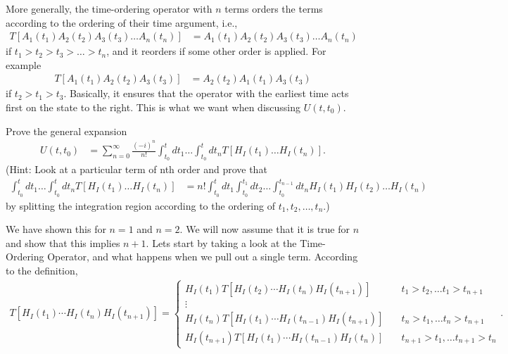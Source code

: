 \documentclass[working, oneside]{../../Preambles/tuftebook}
\begin{document}
More generally, the time-ordering operator with \( n \) terms orders the terms according to the ordering of their time argument, i.e.,
\begin{align*}
T[A_1(t_1) A_2(t_2) A_3(t_3) \dots A_n(t_n)]
&= A_1(t_1) A_2(t_2) A_3(t_3) \dots A_n(t_n) \tag{61}
\end{align*}
if \( t_1 > t_2 > t_3 > \dots > t_n \), and it reorders if some other order is applied. For example
\begin{align*}
T[A_1(t_1) A_2(t_2) A_3(t_3)]
&= A_2(t_2) A_1(t_1) A_3(t_3) \tag{62}
\end{align*}
if \( t_2 > t_1 > t_3 \). Basically, it ensures that the operator with the earliest time acts first on the state to the right. This is what we want when discussing \( U(t, t_0) \).

\begin{exercise}[4]
Prove the general expansion
\begin{align*}
U(t, t_0)
&= \sum_{n=0}^\infty \frac{(-i)^n}{n!} \int_{t_0}^t dt_1 \dots \int_{t_0}^t dt_n T[H_I(t_1) \dots H_I(t_n)]. 
\end{align*}
(Hint: Look at a particular term of nth order and prove that
\begin{align*}
\int_{t_0}^t dt_1 \dots \int_{t_0}^t dt_n T[H_I(t_1) \dots H_I(t_n)]
&= n! \int_{t_0}^t dt_1 \int_{t_0}^{t_1} dt_2 \dots \int_{t_0}^{t_{n-1}} dt_n H_I(t_1) H_I(t_2) \dots H_I(t_n) 
\end{align*}
by splitting the integration region according to the ordering of \( t_1, t_2, \dots, t_n \).)
\end{exercise}
We have shown this for $n=1$ and $n = 2$. We will now assume that it is true for  $n$ and show that this implies $n+1$. Lets start by taking a look at the Time-Ordering Operator, and what happens when we pull out a single term. According to the definition,
 \begin{align*}
    T\left[ H_{I}\left( t_1 \right) \cdots H_{I}\left( t_n \right) H_{I}\left( t_{n+1} \right)  \right] = \begin{cases}
        H_I\left( t_1 \right) T\left[ H_{I}\left( t_2 \right) \cdots H_{I}\left( t_n \right) H_{I}\left( t_{n+1} \right)  \right] \quad & t_1 > t_2, \ldots t_1 > t_{n+1}\\
        \vdots \\
        H_I\left( t_n \right) T\left[ H_{I}\left( t_1 \right) \cdots H_{I}\left( t_{n-1} \right) H_{I}\left( t_{n+1} \right)  \right] \quad & t_n > t_1, \ldots t_n > t_{n+1}\\
        H_I\left( t_{n+1} \right) T\left[ H_{I}\left( t_1 \right) \cdots H_{I}\left( t_{n-1} \right) H_{I}\left( t_{n} \right)  \right] \quad & t_{n+1} > t_1, \ldots t_{n+1} > t_{n}
    \end{cases}
.\end{align*}
\end{document}
